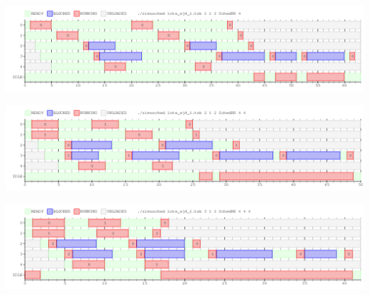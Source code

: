 \begin{center}
 \includegraphics[scale=0.5]{./RR/RR_1cpu.png}
\end{center}

\begin{center}
 \includegraphics[scale=0.5]{./RR/RR_2cpu.png}
\end{center}

\begin{center}
 \includegraphics[scale=0.5]{./RR/RR_3cpu.png}
\end{center}

